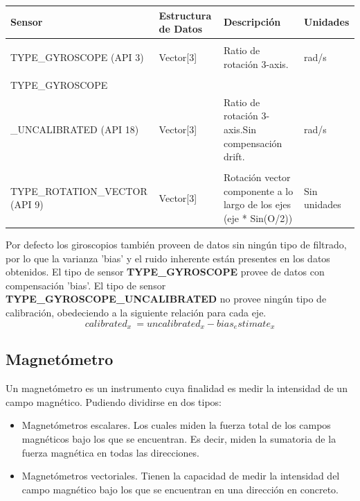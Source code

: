 \begin{table}[H]
\centering
    \begin{tabular}{p{5.0cm} p{2.0cm} p{5.0cm} p{2.0cm}}%
    \hline
    Sensor & Estructura de Datos & Descripción & Unidades \\ \hline
    \\TYPE\_GYROSCOPE (API 3) & Vector[3] & Ratio de rotación 3-axis. & rad/s \\\\ \hline
    TYPE\_GYROSCOPE\\\_UNCALIBRATED (API 18) & Vector[3] & Ratio de rotación 3-axis.Sin compensación drift. & rad/s \\\\ \hline
    TYPE\_ROTATION\_VECTOR (API 9) & Vector[3] & Rotación vector componente a lo largo de los ejes (eje * Sin(O/2)) & Sin unidades \\ \hline
    \end{tabular}
\end{table}
\noindent
Por defecto los giroscopios también proveen de datos sin ningún tipo de filtrado, por lo que la varianza 'bias' y el ruido inherente están presentes en los datos obtenidos. El tipo de sensor \textbf{TYPE\_GYROSCOPE} provee de datos con compensación 'bias'. El tipo de sensor \textbf{TYPE\_GYROSCOPE\_UNCALIBRATED} no provee ningún tipo de calibración, obedeciendo a la siguiente relación para cada eje.
\\

\[calibrated_x ~= uncalibrated_x - bias_estimate_x\]



\subsection{Magnetómetro}

Un magnetómetro es un instrumento cuya finalidad es medir la intensidad de un campo magnético. Pudiendo  dividirse en dos tipos:

\begin{itemize}
\item Magnetómetros escalares. Los cuales miden la fuerza total de los campos magnéticos bajo los que se encuentran. Es decir, miden la sumatoria de la fuerza magnética en todas las direcciones.

\item Magnetómetros vectoriales. Tienen la capacidad de medir la intensidad del campo magnético bajo los que se encuentran en una dirección en concreto.
\end{itemize}

